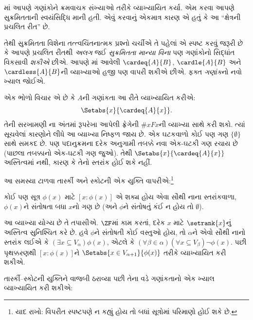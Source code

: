 \begingroup
\makeatletter{}\makeatother

\label{guunit:OLP-0594}


માં આપણે
ગણાંકોને ક્રમવાચક સંખ્યાઓ તરીકે વ્યાખ્યાયિત કર્યા.
એમ કરવા આપણે સુક્રમિતતાની સ્વયંસિદ્ધિ માની હતી.
એવું કરવાનું એકમાત્ર કારણ એ હતું કે આ
``ક્ષેત્રની પ્રચલિત રીત'' છે.

તેથી સુક્રમિતતા વિશેના તત્ત્વચિંતનાત્મક પ્રશ્નો
ચર્ચીએ તે પહેલાં એ સ્પષ્ટ કરવું જરૂરી છે કે આપણે
પ્રચલિત રીતથી \emph{અલગ} જઈ \emph{સુક્રમિતતા
માન્યા વિના} પણ ગણાંકોનો સિદ્ધાંત વિકસાવી
\emph{શકીએ} છીએ. આપણે
માં આવેલી
$\cardeq{A}{B}$, $\cardle{A}{B}$ અને $\cardless{A}{B}$ની
વ્યાખ્યાઓ હજી પણ વાપરી શકીએ છીએ. ફક્ત
\emph{ગણાંક}નો નવો ખ્યાલ જોઈએ.

એક ભોળો વિચાર એ છે કે $A$ની ગણાંકતા આ રીતે
વ્યાખ્યાયિત કરીએ:
\[
	\Setabs{x}{\cardeq{A}{x}}.
\]
તેની સરખામણી ના
અંતમાં રૂપરેખા આપેલી ફ્રેગેની $\# x Fx$ની
વ્યાખ્યા સાથે કરી શકો. ત્યાં સૂચવેલાં કારણોને
લીધે આ વ્યાખ્યા નિષ્ફળ જાય છે. એક ઘટકવાળો
કોઈ પણ ગણ $\{\emptyset\}$ સાથે સમકદ છે.
પણ પદાનુક્રમના દરેક અનુગામી તબક્કે નવા
એક-ઘટકી ગણ રચાય છે (પાછલા તબક્કાનો
એક-ઘટકી ગણ જુઓ). તેથી
$\Setabs{x}{\cardeq{A}{x}}$ અસ્તિત્વમાં નથી,
કારણ કે તેનો સ્તરાંક હોઈ શકે નહીં.

આ સમસ્યા ટાળવા તાર્સ્કી અને સ્કોટની એક
યુક્તિ વાપરીએ:\footnote{યાદ રાખો: વિપરીત
સ્પષ્ટપણે ન કહ્યું હોય તો બધાં સૂત્રોમાં
પરિમાણો હોઈ શકે છે.}

\begin{defn}[તાર્સ્કી--સ્કોટ]
કોઈ પણ સૂત્ર $\phi(x)$ માટે $[ x : \phi(x)] $
એ શક્ય હોય એવા સૌથી નાના સ્તરાંકવાળા,
$\phi(x)$ને સંતોષતા બધા $x$નો ગણ છે
(અને $\phi$ને સંતોષતું કંઈ ન હોય તો $\emptyset$).
\end{defn}

આ વ્યાખ્યા યોગ્ય છે તે તપાસીએ. $\ZF$માં
કામ કરતાં,
દરેક $x$ માટે $\setrank{x}$નું અસ્તિત્વ
સુનિશ્ચિત કરે છે. હવે $\phi$ને સંતોષતી
કોઈ વસ્તુઓ હોય, તો $\alpha$ને એવો સૌથી
નાનો સ્તરાંક લઈએ કે
$(\exists x\subseteq V_\alpha)\phi(x)$,
એટલે કે $(\forall \beta \in \alpha)(\forall x
\subseteq V_\beta)\lnot \phi(x)$.
પછી પૃથક્કરણથી $[x : \phi(x)]$ને
$\Setabs{x \in V_{\alpha+1}}{\phi(x)}$
તરીકે વ્યાખ્યાયિત કરી શકીએ.

તાર્સ્કી--સ્કોટની યુક્તિને વાજબી ઠરાવ્યા
પછી તેના વડે ગણાંકતાનો એક ખ્યાલ
વ્યાખ્યાયિત કરી શકીએ:

